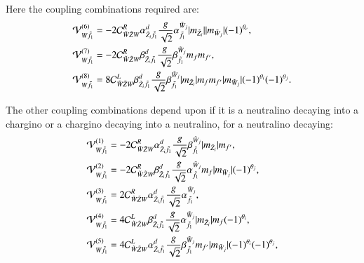 \documentclass[final,3p,times,pdflatex]{elsarticle}
\begin{document}
Here the coupling combinations required are:
\begin{align}
\mathcal{V}_{W \tilde{f}_1}^{(6)} &= -2 \mathcal{C}_{\tilde{W} \tilde{Z} W}^R \alpha_{\tilde{Z}_i \tilde{f}_1}^{d} {g \over \sqrt{2}} \alpha_{\tilde{f}_1}^{\tilde{W}_j}|m_{\tilde{Z}_i}||m_{\tilde{W}_j}|(-1)^{\theta_c}, \\
\mathcal{V}_{W \tilde{f}_1}^{(7)} &= -2 \mathcal{C}_{\tilde{W} \tilde{Z} W}^R \beta_{\tilde{Z}_i \tilde{f}_1}^{d} {g \over \sqrt{2}} \beta_{\tilde{f}_1}^{\tilde{W}_j}m_{f}m_{f'}, \\
\mathcal{V}_{W \tilde{f}_1}^{(8)} &= 8 \mathcal{C}_{\tilde{W} \tilde{Z} W}^L \beta_{\tilde{Z}_i \tilde{f}_1}^{d} {g \over \sqrt{2}} \beta_{\tilde{f}_1}^{\tilde{W}_j} |m_{\tilde{Z}_i}|m_{f} m_{f'}|m_{\tilde{W}_j}|(-1)^{\theta_i}(-1)^{\theta_j}.
\end{align}

The other coupling combinations depend upon if it is a neutralino decaying into a chargino or a chargino decaying into a neutralino, for a neutralino decaying:
\begin{align}
\mathcal{V}_{W \tilde{f}_1}^{(1)} &= -2 \mathcal{C}_{\tilde{W} \tilde{Z} W}^R \alpha_{\tilde{Z}_i \tilde{f}_1}^{d} {g \over \sqrt{2}} \beta_{\tilde{f}_1}^{\tilde{W}_j}|m_{\tilde{Z}_i}| m_{f'}, \\
\mathcal{V}_{W \tilde{f}_1}^{(2)} &= -2 \mathcal{C}_{\tilde{W} \tilde{Z} W}^R \beta_{\tilde{Z}_i \tilde{f}_1}^{d} {g \over \sqrt{2}} \alpha_{\tilde{f}_1}^{\tilde{W}_j} m_{f} |m_{\tilde{W}_j}|(-1)^{\theta_j}, \\
\mathcal{V}_{W \tilde{f}_1}^{(3)} &= 2 \mathcal{C}_{\tilde{W} \tilde{Z} W}^R \alpha_{\tilde{Z}_i \tilde{f}_1}^{d} {g \over \sqrt{2}} \alpha_{\tilde{f}_1}^{\tilde{W}_j}, \\
\mathcal{V}_{W \tilde{f}_1}^{(4)} &= 4 \mathcal{C}_{\tilde{W} \tilde{Z} W}^L \beta_{\tilde{Z}_i \tilde{f}_1}^{d} {g \over \sqrt{2}} \alpha_{\tilde{f}_1}^{\tilde{W}_j}|m_{\tilde{Z}_i}|m_{f}(-1)^{\theta_i}, \\
\mathcal{V}_{W \tilde{f}_1}^{(5)} &= 4 \mathcal{C}_{\tilde{W} \tilde{Z} W}^L \alpha_{\tilde{Z}_i \tilde{f}_1}^{d} {g \over \sqrt{2}} \beta_{\tilde{f}_1}^{\tilde{W}_j} m_{f'}|m_{\tilde{W}_j}|(-1)^{\theta_i}(-1)^{\theta_j},
\end{align}
\end{document}
